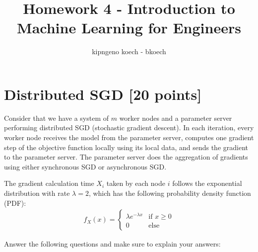 \documentclass[a3paper,12pt]{extarticle} %
\begin{document}
\author{kipngeno koech - bkoech}
\title{Homework 4 - Introduction to Machine Learning for Engineers}   
\maketitle

\medskip

\maketitle

\section{Distributed SGD [20 points]}
Consider that we have a system of $m$ worker nodes and a parameter server performing distributed SGD (stochastic gradient descent). In each iteration, every worker node receives the model from the parameter server, computes one gradient step of the objective function locally using its local data, and sends the gradient to the parameter server. The parameter server does the aggregation of gradients using either synchronous SGD or asynchronous SGD.

The gradient calculation time $X_i$ taken by each node $i$ follows the exponential distribution with rate $\lambda = 2$, which has the following probability density function (PDF):
\begin{align}
f_X(x) = 
\begin{cases}
\lambda e^{-\lambda x} & \text{if } x \geq 0\\
0 & \text{else}
\end{cases}
\end{align}

Answer the following questions and make sure to explain your answers:
\end{document}
